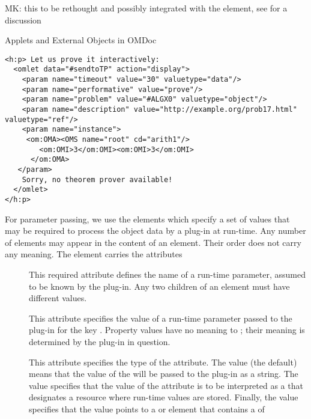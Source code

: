 \begin{module}[id=ext]
\begin{omgroup}[id=ext,short=Auxiliary Elements]
\begin{oldpart}{MK: this to be rethought and possibly integrated with the
     element, see  for a discussion}
\begin{omgroup}[id=applets]{Applets and External Objects in OMDoc}
\begin{lstlisting}[label=lst:omlet2,mathescape,
  caption={An \element{omlet} for Connecting to a Theorem Prover},
  index={omlet}]
<h:p> Let us prove it interactively:
  <omlet data="#sendtoTP" action="display">
    <param name="timeout" value="30" valuetype="data"/>
    <param name="performative" value="prove"/>
    <param name="problem" value="#ALGX0" valuetype="object"/>
    <param name="description" value="http://example.org/prob17.html" valuetype="ref"/>
    <param name="instance">
     <om:OMA><OMS name="root" cd="arith1"/>
        <om:OMI>3</om:OMI><om:OMI>3</om:OMI>
      </om:OMA>
   </param>   
    Sorry, no theorem prover available!
  </omlet>
</h:p>
\end{lstlisting}

\begin{definition}[id=parameter.def]
  For parameter passing, we use the {} elements which specify a set of values
  that may be required to process the object data by a plug-in at run-time. Any number of
   elements may appear in the content of an 
  element. Their order does not carry any meaning. The  element carries
  the attributes
\begin{description}
\item[] This required attribute defines the name of a
  run-time parameter, assumed to be known by the plug-in. Any two 
  children of an  element must have different
   values.
\item[] This attribute specifies the value of a run-time
  parameter passed to the plug-in for the key . Property
  values have no meaning to \omdoc; their meaning is determined by the plug-in in
  question.
\item[] This attribute specifies the type of the
   attribute. The value
   (the default) means that the value of the
   will be passed to the plug-in as a string.  The value
   specifies that the value of the
   attribute is to be interpreted as a
  {} that designates a resource where run-time values are
  stored. Finally, the value  specifies that
  the  value points to a  or
   element that contains a {} of

\end{description}
\end{definition}
\end{omgroup}
\end{oldpart}
\end{omgroup}
\end{module}
